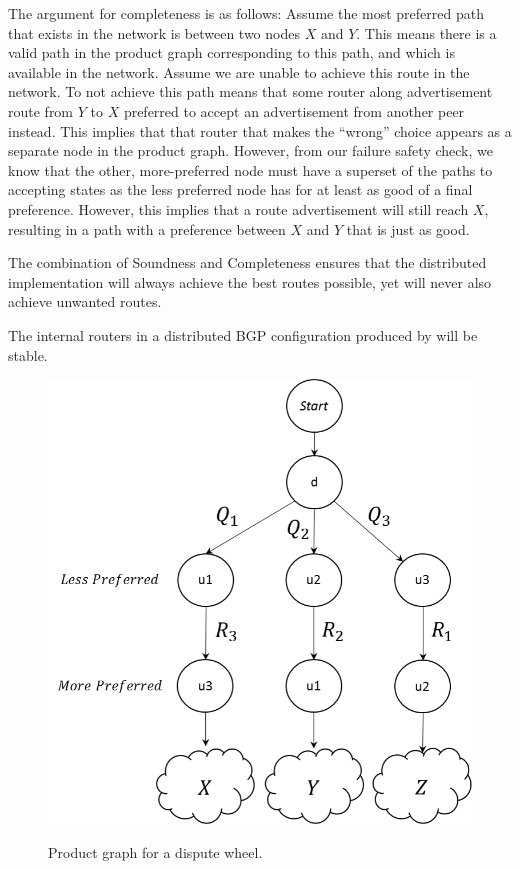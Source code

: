 The argument for completeness is as follows: Assume the most preferred path that exists in the network is between two nodes $X$ and $Y$.  This means there is a valid path in the product graph corresponding to this path, and which is available in the network. 
Assume we are unable to achieve this route in the network. To not achieve this path means that some router along advertisement route from $Y$ to $X$ preferred to accept an advertisement from another peer instead. This implies that that router that makes the ``wrong'' choice appears as a separate node in the product graph. However, from our failure safety check, we know that the other, more-preferred node must have a superset of the paths to accepting states as the less preferred node has for at least as good of a final preference. However, this implies that a route advertisement will still reach $X$, resulting in a path with a preference between $X$ and $Y$ that is just as good.

The combination of Soundness and Completeness ensures that the distributed implementation will always achieve the best routes possible, yet will never also achieve unwanted routes. 

\begin{defn}
The internal routers in a distributed BGP configuration produced by \sysname will be stable. 
\end{defn}

\begin{figure}[t!]
\includegraphics[width=\columnwidth]{figures/dispute-wheel}
\label{fig:dispute-wheel}
\caption{Product graph for a dispute wheel.}
\end{figure}


